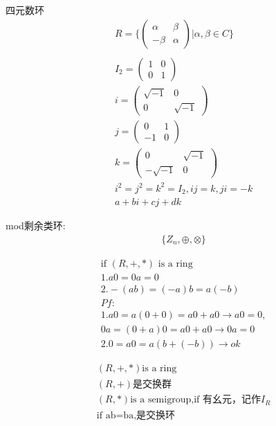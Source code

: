 \documentclass[12pt, a4paper]{article}  %
\begin{document}
四元数环\\
\begin{align}
    &R=\{\begin{pmatrix}
        \alpha & \beta\\
        -\beta & \alpha
    \end{pmatrix} |\alpha,\beta \in C\}\\
    &\\
    &I_2=\begin{pmatrix}
        1&0\\
        0&1
    \end{pmatrix}\\
    &i=\begin{pmatrix}
        \sqrt{-1}&0\\
        0&\sqrt{-1}
    \end{pmatrix}\\
    &j=\begin{pmatrix}
        0&1\\
        -1&0
    \end{pmatrix}\\
    &k=\begin{pmatrix}
        0&\sqrt{-1}\\
        -\sqrt{-1}&0
    \end{pmatrix}\\
    &i^2=j^2=k^2=I_2,ij=k,ji=-k\\
    &a+bi+cj+dk
\end{align}

mod剩余类环:
\begin{align}
    &\{Z_n,\oplus,\otimes\}
\end{align}

\begin{align}
    &\text{if }(R,+,*)\text{ is a ring}\\
    &1.a0=0a=0\\
    &2.-(ab)=(-a)b=a(-b)\\
    &Pf:\\
    &1. a0=a(0+0)=a0+a0\rightarrow a0=0,\\
    &0a=(0+a)0=a0+a0\rightarrow 0a=0\\
    &2.0=a0=a(b+(-b))\rightarrow ok
\end{align}


\begin{align}
    &(R,+,*)\text{is a ring}\\
    &(R,+)\text{是交换群}\\
    &(R,*)\text{is a semigroup,if 有幺元，记作}I_R\\
    &\text{if ab=ba,是交换环}
\end{align}
\end{document}
